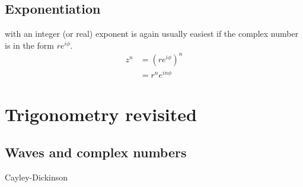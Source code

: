 \subsection{Exponentiation} with an integer (or real) exponent is again usually easiest if the complex number is in the form $re^{i\phi}$.
\begin{align*}
z^n &= (re^{i\phi})^n \\
&= r^n e^{in\phi}
\end{align*}
\section{Trigonometry revisited}
\subsection{Waves and complex numbers}

Cayley-Dickinson